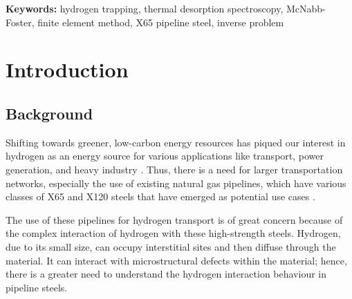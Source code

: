 \documentclass[a4paper,12pt,oneside]{report}
\begin{document}
\vspace{1cm}

\noindent\textbf{Keywords:} hydrogen trapping, thermal desorption spectroscopy, McNabb-Foster, finite element method, X65 pipeline steel, inverse problem


\newpage


\tableofcontents

\cleardoublepage

\listoffigures

\cleardoublepage


\chapter{Introduction}



\section{Background}

Shifting towards greener, low-carbon energy resources has piqued our interest in hydrogen as an energy source for various applications like transport, power generation, and heavy industry \cite{Lv2026,Chen2025}. Thus, there is a need for larger transportation networks, especially the use of existing natural gas pipelines, which have various classes of X65 and X120 steels that have emerged as potential use cases \cite{Koren2023a,Koren2024a}.

The use of these pipelines for hydrogen transport is of great concern because of the complex interaction of hydrogen with these high-strength steels. Hydrogen, due to its small size, can occupy interstitial sites and then diffuse through the material. It can interact with microstructural defects within the material; hence, there is a greater need to understand the hydrogen interaction behaviour in pipeline steels.
\end{document}
